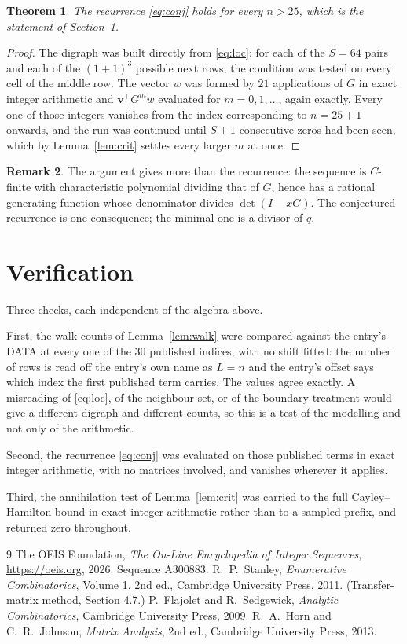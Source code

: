 \documentclass[11pt,a4paper]{article}
\theoremstyle{plain}
\newtheorem{theorem}{Theorem}
\theoremstyle{definition}
\newtheorem{remark}[theorem]{Remark}
\begin{document}
\begin{theorem}
The recurrence \eqref{eq:conj} holds for every $n>25$, which is the statement of
Section~1.
\end{theorem}

\begin{proof}
The digraph was built directly from \eqref{eq:loc}: for each of the $S=64$ pairs and each
of the $(1+1)^{3}$ possible next rows, the condition was tested on every cell of
the middle row. The vector $w$ was formed by $21$ applications of $G$ in exact integer
arithmetic and $\mathbf{v}^{\!\top}G^{m}w$ evaluated for $m=0,1,\dots$, again exactly.
Every one of those integers vanishes from the index corresponding to $n=25+1$ onwards,
and the run was continued until $S+1$ consecutive zeros had been seen, which by
Lemma~\ref{lem:crit} settles every larger $m$ at once.
\end{proof}

\begin{remark}
The argument gives more than the recurrence: the sequence is $C$-finite with characteristic
polynomial dividing that of $G$, hence has a rational generating function whose denominator
divides $\det(I-xG)$. The conjectured recurrence is one consequence; the minimal one is a
divisor of $q$.
\end{remark}

\section{Verification}

Three checks, each independent of the algebra above.

First, the walk counts of Lemma~\ref{lem:walk} were compared against the entry's DATA at
every one of the $30$ published indices, with no shift fitted: the number of rows is
read off the entry's own name as $L=n$ and the entry's offset says which index the first
published term carries. The values agree exactly. A misreading of \eqref{eq:loc}, of the
neighbour set, or of the boundary treatment would give a different digraph and different
counts, so this is a test of the modelling and not only of the arithmetic.

Second, the recurrence \eqref{eq:conj} was evaluated on those published terms in exact
integer arithmetic, with no matrices involved, and vanishes wherever it applies.

Third, the annihilation test of Lemma~\ref{lem:crit} was carried to the full
Cayley--Hamilton bound in exact integer arithmetic rather than to a sampled prefix, and
returned zero throughout.

\begin{thebibliography}{9}
 The OEIS Foundation, \emph{The On-Line Encyclopedia of Integer
Sequences}, \url{https://oeis.org}, 2026. Sequence A300883.
 R.~P.~Stanley, \emph{Enumerative Combinatorics}, Volume 1, 2nd ed.,
Cambridge University Press, 2011. (Transfer-matrix method, Section 4.7.)
 P.~Flajolet and R.~Sedgewick, \emph{Analytic Combinatorics}, Cambridge
University Press, 2009.
 R.~A.~Horn and C.~R.~Johnson, \emph{Matrix Analysis}, 2nd ed., Cambridge
University Press, 2013.
\end{thebibliography}
\end{document}
